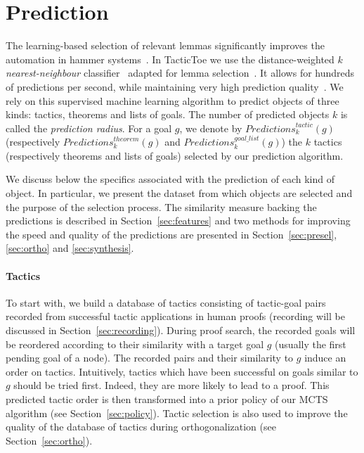 \documentclass[runningheads,a4paper,draft]{svjour3}
\def\tactictoe{\textsf{TacticToe}\xspace}
\begin{document}
\section{Prediction}\label{s:prediction}
The learning-based selection of relevant lemmas significantly improves the
automation in hammer systems~\cite{BlanchetteGKKU16}. In \tactictoe we use the
distance-weighted \emph{$k$ nearest-neighbour} classifier~\cite{DudaniS76}
adapted for lemma selection~\cite{ckju-pxtp13}. It allows for hundreds of
predictions per second, while maintaining very high prediction quality~\cite{femalecop}.
We rely on this supervised machine learning algorithm to predict objects of 
three kinds: tactics, theorems and lists of goals. The number of predicted 
objects $k$ is
 called the \emph{prediction radius}. For a goal $g$, we denote
by $\mathit{Predictions}^{\mathit{tactic}}_k (g)$ (respectively
$\mathit{Predictions}^{\mathit{theorem}}_k (g)$
and $\mathit{Predictions}^{\mathit{goal\_list}}_k (g)$) the $k$ tactics
(respectively theorems and lists of goals) selected by our prediction algorithm.

We discuss below the specifics associated with the prediction of each kind of object.
In particular, we present the dataset from which objects are selected and the
purpose of the selection process. The similarity measure backing the
predictions is described in Section~\ref{sec:features} and two methods for
improving the speed and quality of the predictions are presented in
Section~\ref{sec:presel},\ref{sec:ortho} and \ref{sec:synthesis}.

\paragraph{Tactics}
To start with, we build a database of tactics consisting
of tactic-goal pairs recorded from successful tactic applications in human
proofs (recording will be discussed in
Section~\ref{sec:recording}).
During proof search, the recorded goals will be reordered according to their
similarity with a target goal $g$ (usually the first pending goal of a node).
The recorded pairs and their similarity to $g$ induce an
order on tactics. Intuitively, tactics which have been successful on
goals similar to $g$ should be tried first. Indeed, they are more likely to lead
to a proof.
This predicted tactic order is then transformed into a prior policy of our MCTS
algorithm (see Section~\ref{sec:policy}).
Tactic selection is also used to improve the quality of the database
of tactics during orthogonalization (see Section~\ref{sec:ortho}).
\end{document}
